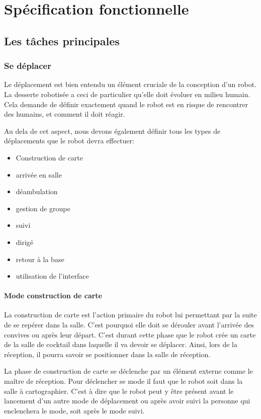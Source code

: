 \chapter{Spécification fonctionnelle}

\section{Les tâches principales}

\subsection{Se déplacer}

Le déplacement est bien entendu un élément cruciale de la conception
d'un robot. La desserte robotisée a ceci de particulier qu'elle doit
évoluer en milieu humain. Cela demande de définir exactement quand le
robot est en risque de rencontrer des humains, et comment il doit
réagir.

Au dela de cet aspect, nous devons également définir tous les types de
déplacements que le robot devra effectuer:

\begin{itemize}
\item Construction de carte
\item arrivée en salle
\item déambulation
\item gestion de groupe
\item suivi
\item dirigé
\item retour à la base
\item utilisation de l'interface
\end{itemize}

\subsubsection{Mode construction de carte}
La construction de carte est l'action primaire du robot lui permettant par la suite de se repérer dans la salle. C'est pourquoi elle doit se dérouler avant l'arrivée des convives ou après leur départ. C'est durant cette phase que le robot crée un carte de la salle de cocktail dans laquelle il va devoir se déplacer. Ainsi, lors de la réception, il pourra savoir se positionner dans la salle de réception.

La phase de construction de carte se déclenche par un élément externe comme le maître de réception. Pour déclencher se mode il faut que le robot soit dans la salle à cartographier. C'est à dire que le robot peut y être présent avant le lancement d'un autre mode de déplacement ou après avoir suivi la personne qui enclenchera le mode, soit après le mode suivi.


